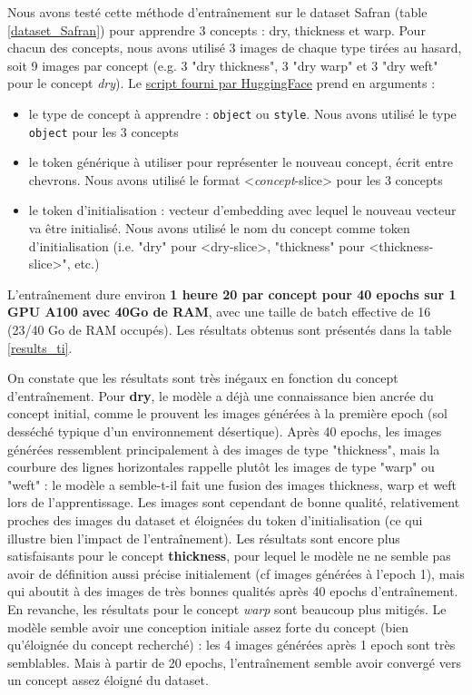 \documentclass{article}
\begin{document}
Nous avons testé cette méthode d'entraînement sur le dataset Safran (table \ref{dataset_Safran}) pour apprendre 3 concepts : dry, thickness et warp. Pour chacun des concepts, nous avons utilisé 3 images de chaque type tirées au hasard, soit 9 images par concept (e.g. 3 "dry thickness", 3 "dry warp" et 3 "dry weft" pour le concept \textit{dry}). Le \href{https://github.com/huggingface/diffusers/tree/main/examples/textual_inversion}{script fourni par HuggingFace} prend en arguments :
\begin{itemize}
    \item le type de concept à apprendre : \texttt{object} ou \texttt{style}. Nous avons utilisé le type \texttt{object} pour les 3 concepts
    \item le token générique à utiliser pour représenter le nouveau concept, écrit entre chevrons. Nous avons utilisé le format <\textit{concept}-slice> pour les 3 concepts
    \item le token d'initialisation : vecteur d'embedding avec lequel le nouveau vecteur va être initialisé. Nous avons utilisé le nom du concept comme token d'initialisation (i.e. "dry" pour <dry-slice>, "thickness" pour <thickness-slice>", etc.)
\end{itemize}
L'entraînement dure environ \textbf{1 heure 20 par concept pour 40 epochs sur 1 GPU A100 avec 40Go de RAM}, avec une taille de batch effective de 16 (23/40 Go de RAM occupés). Les résultats obtenus sont présentés dans la table \ref{results_ti}. \par
On constate que les résultats sont très inégaux en fonction du concept d'entraînement. Pour \textbf{dry}, le modèle a déjà une connaissance bien ancrée du concept initial, comme le prouvent les images générées à la première epoch (sol desséché typique d'un environnement désertique). Après 40 epochs, les images générées ressemblent principalement à des images de type "thickness", mais la courbure des lignes horizontales rappelle plutôt les images de type "warp" ou "weft" : le modèle a semble-t-il fait une fusion des images thickness, warp et weft lors de l'apprentissage. Les images sont cependant de bonne qualité, relativement proches des images du dataset et éloignées du token d'initialisation (ce qui illustre bien l'impact de l'entraînement). Les résultats sont encore plus satisfaisants pour le concept \textbf{thickness}, pour lequel le modèle ne ne semble pas avoir de définition aussi précise initialement (cf images générées à l'epoch 1), mais qui aboutit à des images de très bonnes qualités après 40 epochs d'entraînement. En revanche, les résultats pour le concept \textit{warp} sont beaucoup plus mitigés. Le modèle semble avoir une conception initiale assez forte du concept (bien qu'éloignée du concept recherché) : les 4 images générées après 1 epoch sont très semblables. Mais à partir de 20 epochs, l'entraînement semble avoir convergé vers un concept assez éloigné du dataset.
\end{document}
